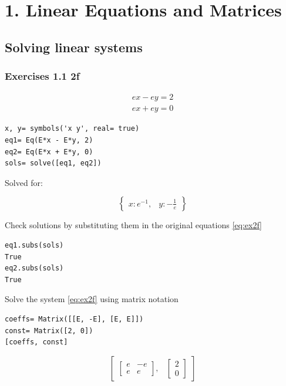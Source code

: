 \section{1. Linear Equations and Matrices}

\subsection{Solving linear systems}

\subsubsection{Exercises 1.1 2f} 

\begin{equation}\label{eq:ex2f}
    \begin{matrix}
    e x - e y = 2 \\
    e x + e y = 0
    \end{matrix}
\end{equation}

\begin{verbatim}
x, y= symbols('x y', real= true)
eq1= Eq(E*x - E*y, 2)
eq2= Eq(E*x + E*y, 0)
sols= solve([eq1, eq2])
\end{verbatim}

Solved for:

\begin{equation}\label{eq:ex2fsol}
\begin{Bmatrix}x : e^{-1}, & y : - \frac{1}{e}\end{Bmatrix}
\end{equation}

Check solutions by substituting them in the original equations \ref{eq:ex2f}

\begin{verbatim}
eq1.subs(sols)
True
eq2.subs(sols)
True
\end{verbatim}

Solve the system \ref{eq:ex2f} using matrix notation

\begin{verbatim}
coeffs= Matrix([[E, -E], [E, E]])
const= Matrix([2, 0])
[coeffs, const]
\end{verbatim}

\begin{equation}
\begin{bmatrix}\left[\begin{matrix}e & - e\\e & e\end{matrix}\right], & \left[\begin{matrix}2\\0\end{matrix}\right]\end{bmatrix}
\end{equation}

